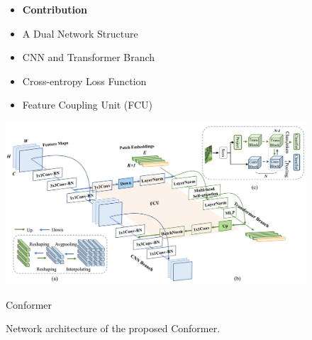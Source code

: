 \documentclass[CJK,aspectratio=169]{beamer}  %
\begin{document}
	\begin{frame}
		
		
		\begin{figure}
			\centering
			\begin{minipage}{.4\textwidth}
				\centering
				\small
				\begin{itemize}
					\item \textbf{Contribution}
					
					\item[\checkmark]
					A Dual Network Structure
					
					\item[\checkmark]
					CNN and Transformer Branch
					
					\item[\checkmark]
					Cross-entropy Loss Function
					
					\item[\checkmark]
					Feature Coupling Unit (FCU)
				\end{itemize}
				\captionsetup{font=scriptsize}
				\label{fig: Contribution}
			\end{minipage}
			\begin{minipage}{.58\textwidth}
				\centering
				\includegraphics[width=\linewidth]{picture/LLIE/Conformer/the proposed Conformer}
				\captionsetup{font=scriptsize}
				\label{fig: Conformer}	
				\caption*{Conformer}
			\end{minipage}
			\captionsetup{font=scriptsize}
			\caption{
				\label{fig: Conformer contribution}
				Network architecture of the proposed Conformer.
			}
		\end{figure}
		
	\end{frame}
	
\end{document}
